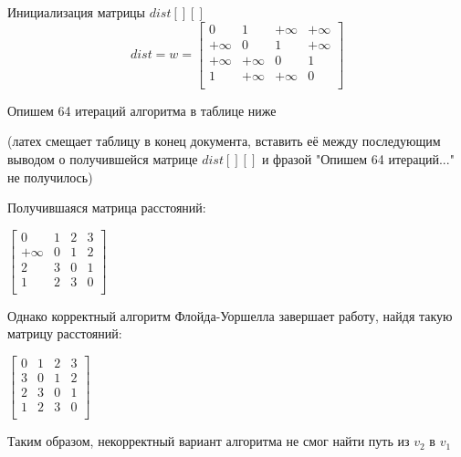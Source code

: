 \documentclass{report}
\begin{document}
Инициализация матрицы $dist[][]$
$$
dist = w = \begin{bmatrix}
0 & 1 & +\infty & +\infty \\
+\infty & 0 & 1 & +\infty \\
+\infty & +\infty & 0 & 1 \\
1 & +\infty & +\infty & 0 \\
\end{bmatrix}
$$

\raggedright
Опишем 64 итераций алгоритма в таблице ниже

(латех смещает таблицу в конец документа, вставить её между последующим выводом о получившейся матрице $dist[][]$ и фразой "Опишем 64 итераций..." не получилось)

Получившаяся матрица расстояний:

$\begin{bmatrix}
    0 & 1 & 2 & 3 \\
    +\infty & 0 & 1 & 2 \\
    2 & 3 & 0 & 1 \\
    1 & 2 & 3 & 0 \\
\end{bmatrix}$

Однако корректный алгоритм Флойда-Уоршелла завершает работу, найдя такую матрицу расстояний:

$\begin{bmatrix}
    0 & 1 & 2 & 3 \\
    3 & 0 & 1 & 2 \\
    2 & 3 & 0 & 1 \\
    1 & 2 & 3 & 0 \\
\end{bmatrix}$

Таким образом, некорректный вариант алгоритма не смог найти путь из $v_2$ в $v_1$

\par
\end{document}
